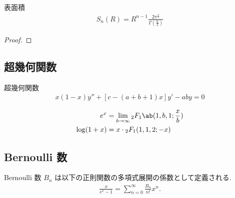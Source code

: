 \documentclass[uplatex,diffipdfmx,a4paper,11pt]{jlreq}
\begin{document}
\begin{theorem}
  表面積
  \begin{align}
    S_n(R) = R^{n-1}\frac{2\pi^{\frac{\pi}{2}}}{\Gamma(\frac{n}{2})}
  \end{align}
\end{theorem}
\begin{proof}

\end{proof}

\begin{proposition}

\end{proposition}

\subsection{超幾何関数}
\begin{definition}
  超幾何関数
  \begin{align}
    x(1 - x)y'' + [c - (a + b + 1)x]y' - aby = 0
  \end{align}
\end{definition}
\begin{proposition}
  \begin{align}
    e^x         & = \lim_{b\to\infty}{}_2F_1\ab(1,b,1;\frac{x}{b}) \\
    \log(1 + x) & = x\cdot{}_2F_1(1,1,2;-x)
  \end{align}
\end{proposition}

\subsection{Bernoulli 数}
\begin{definition}[Bernoulli 数]
  Bernoulli 数 $B_n$ は以下の正則関数の多項式展開の係数として定義される.
  \begin{align}
    \frac{x}{e^x - 1} = \sum_{n=0}^{\infty}\frac{B_n}{n!}x^n.
  \end{align}
\end{definition}
\end{document}
